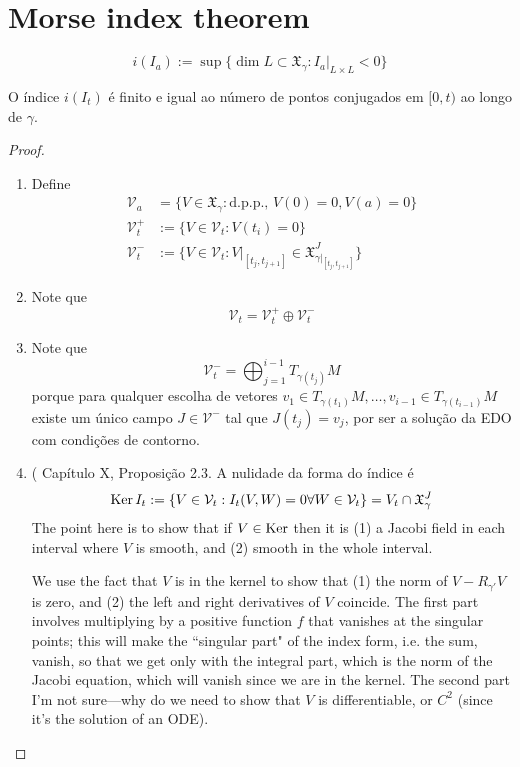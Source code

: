 \section{Morse index theorem}
\label{section-morse-index}

\begin{definition}
\label{definition-index-index-form}
$$
i(I_a):=\operatorname{sup}\{\dim L \subset \mathfrak{X}_\gamma:I_a |_{L \times L}<0\}
$$
\end{definition}


\begin{theorem}
\label{theorem-morse-index}
O índice $i(I_t)$ é finito e igual ao número de pontos conjugados em $[0,t)$ ao
longo de $\gamma$.
\end{theorem}

\begin{proof}
\begin{enumerate}
\item Define
\begin{align*}
\mathcal{V}_a&=\{V \in \mathfrak{X}_\gamma:\text{d.p.p., }V(0)=0, V(a)=0\}\\
\mathcal{V}_t^+&:=\{V \in \mathcal{V}_t:V(t_i)=0\}\\
\mathcal{V}_t^-& :=\{V \in \mathcal{V}_t:V|_{[t_j,t_{j+1}]}\in
\mathfrak{X}_{\gamma|_{[t_j,t_{j+1}]}}^J\}
\end{align*}
\item Note que
$$
\mathcal{V}_t=\mathcal{V}_t^+ \oplus  \mathcal{V}_t^-
$$
\item Note que 
$$
\mathcal{V}_t^-=\bigoplus_{j=1}^{i-1}T_{\gamma(t_j)}M
$$
porque para qualquer escolha de vetores
 $v_1 \in T_{\gamma(t_1)}M,\ldots,v_{i-1}\in T_{\gamma(t_{i-1})}M$ existe
 um único campo $J \in \mathcal{V}^-$ tal que $J(t_j)=v_j$, por ser a solução
 da EDO com condições de contorno.
\item (\cite{doc} Capítulo X, Proposição 2.3. A nulidade da forma do índice é
$$
\mathop{\mathrm{Ker}} I_t:=\{V \in \mathcal{V}_t:I_t(V,W)=0\forall W\in\mathcal{V}_t\}=
V_t \cap \mathfrak{X}_\gamma^J 
$$
The point here is to show that if $V \in \mathop{\mathrm{Ker}}$ then it is (1) a Jacobi
 field in each interval where $V$ is smooth, and (2) smooth in the whole
 interval.

We use the fact that $V$ is in the kernel to show that (1) the norm of 
$V-R_{\gamma'}V$ is zero, and (2) the left and right derivatives of $V$
coincide. The first part involves multiplying by a positive function $f$ that
vanishes at the singular points; this will make the ``singular part" of the
index form, i.e. the sum, vanish, so that we get only with the integral part,
which is the norm of the Jacobi equation, which will vanish since we are in the
kernel. The second part I'm not sure---why do we need to show that $V$ is
differentiable, or $C^2$ (since it's the solution of an ODE).
\end{enumerate}
\end{proof}

